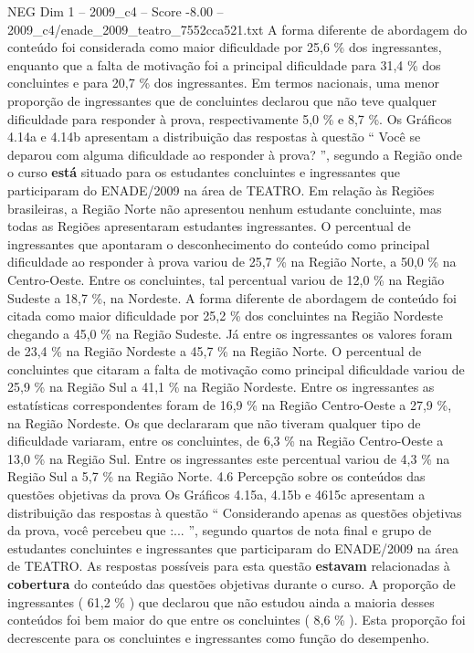 \begin{textsample}{NEG Dim 1 – 2009\_c4 – Score -8.00 – 2009\_c4/enade\_2009\_teatro\_7552cca521.txt}
A forma diferente de abordagem do conteúdo foi considerada como maior dificuldade por 25,6 \% dos ingressantes, enquanto que a falta de motivação foi a principal dificuldade para 31,4 \% dos concluintes e para 20,7 \% dos ingressantes.
Em termos nacionais, uma menor proporção de ingressantes que de concluintes declarou que não teve qualquer dificuldade para responder à prova, respectivamente 5,0 \% e 8,7 \%.
Os Gráficos 4.14a e 4.14b apresentam a distribuição das respostas à questão “ Você se deparou com alguma dificuldade ao responder à prova? ”, segundo a Região onde o curso \textbf{está} situado para os estudantes concluintes e ingressantes que participaram do ENADE/2009 na área de TEATRO.
Em relação às Regiões brasileiras, a Região Norte não apresentou nenhum estudante concluinte, mas todas as Regiões apresentaram estudantes ingressantes.
O percentual de ingressantes que apontaram o desconhecimento do conteúdo como principal dificuldade ao responder à prova variou de 25,7 \% na Região Norte, a 50,0 \% na Centro-Oeste.
Entre os concluintes, tal percentual variou de 12,0 \% na Região Sudeste a 18,7 \%, na Nordeste.
A forma diferente de abordagem de conteúdo foi citada como maior dificuldade por 25,2 \% dos concluintes na Região Nordeste chegando a 45,0 \% na Região Sudeste.
Já entre os ingressantes os valores foram de 23,4 \% na Região Nordeste a 45,7 \% na Região Norte.
O percentual de concluintes que citaram a falta de motivação como principal dificuldade variou de 25,9 \% na Região Sul a 41,1 \% na Região Nordeste.
Entre os ingressantes as estatísticas correspondentes foram de 16,9 \% na Região Centro-Oeste a 27,9 \%, na Região Nordeste.
Os que declararam que não tiveram qualquer tipo de dificuldade variaram, entre os concluintes, de 6,3 \% na Região Centro-Oeste a 13,0 \% na Região Sul.
Entre os ingressantes este percentual variou de 4,3 \% na Região Sul a 5,7 \% na Região Norte. 4.6 Percepção sobre os conteúdos das questões objetivas da prova Os Gráficos 4.15a, 4.15b e 4615c apresentam a distribuição das respostas à questão “ Considerando apenas as questões objetivas da prova, você percebeu que :... ”, segundo quartos de nota final e grupo de estudantes concluintes e ingressantes que participaram do ENADE/2009 na área de TEATRO.
As respostas possíveis para esta questão \textbf{estavam} relacionadas à \textbf{cobertura} do conteúdo das questões objetivas durante o curso.
A proporção de ingressantes ( 61,2 \% ) que declarou que não estudou ainda a maioria desses conteúdos foi bem maior do que entre os concluintes ( 8,6 \% ).
Esta proporção foi decrescente para os concluintes e ingressantes como função do desempenho.

\end{textsample}
